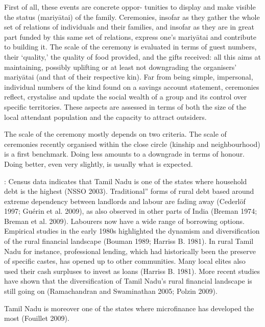 \documentclass[a4paper, 11pt, onecolumn]{article}
\begin{document}
First of all, these events are concrete oppor-
tunities to display and make visible the status (mariyātai) of the family. Ceremonies, insofar as they
gather the whole set of relations of individuals and their families, and insofar as they are in great part
funded by this same set of relations, express one’s mariyātai and contribute to building it. The scale of
the ceremony is evaluated in terms of guest numbers, their ‘quality,’ the quality of food provided, and
the gifts received: all this aims at maintaining, possibly uplifting or at least not downgrading the
organisers’ mariyātai (and that of their respective kin). Far from being simple, impersonal, individual
numbers of the kind found on a savings account statement, ceremonies reflect, crystalise and update
the social wealth of a group and its control over specific territories. These aspects are assessed in
terms of both the size of the local attendant population and the capacity to attract outsiders.

The scale of the ceremony mostly depends on two criteria. The scale of ceremonies recently
organised within the close circle (kinship and neighbourhood) is a first benchmark. Doing less
amounts to a downgrade in terms of honour. Doing better, even very slightly, is usually what is
expected.









\cite{Guerin2014a} : Census data indicates that Tamil Nadu is one of the states where household debt is the highest (NSSO
2003). 
Traditional” forms of rural debt based around extreme dependency between
landlords and labour are fading away (Cederlöf 1997; Guérin et al. 2009), as also observed in
other parts of India (Breman 1974; Breman et al. 2009). Labourers now have a wide range of
borrowing options. Empirical studies in the early 1980s highlighted the dynamism and
diversification of the rural financial landscape (Bouman 1989; Harriss B. 1981). In rural
Tamil Nadu for instance, professional lending, which had historically been the preserve of
specific castes, has opened up to other communities. Many local elites also used their cash
surpluses to invest as loans (Harriss B. 1981). More recent studies have shown that the
diversification of Tamil Nadu’s rural financial landscape is still going on (Ramachandran and
Swaminathan 2005; Polzin 2009).

Tamil Nadu is
moreover one of the states where microfinance has developed the most (Fouillet 2009).
\end{document}
